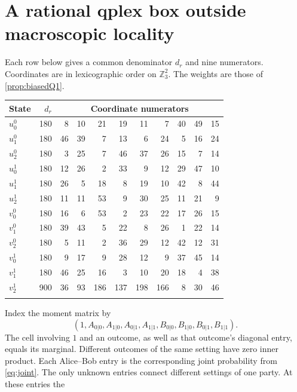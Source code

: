 \section{A rational qplex box outside macroscopic locality}\label{app:biased}
Each row below gives a common denominator $d_r$ and nine numerators. Coordinates
are in lexicographic order on $\mathbb Z_3^2$. The weights are those of \cref{prop:biasedQ1}.
\begin{center}
\small
\begin{tabular}{@{}lr@{\hspace{1.5em}}rrrrrrrrr@{}}
\toprule
State & $d_r$ & \multicolumn{9}{c}{Coordinate numerators}\\
\midrule
$u^{0}_{0}$ & 180 & 8 & 10 & 21 & 19 & 11 & 7 & 40 & 49 & 15 \\
$u^{0}_{1}$ & 180 & 46 & 39 & 7 & 13 & 6 & 24 & 5 & 16 & 24 \\
$u^{0}_{2}$ & 180 & 3 & 25 & 7 & 46 & 37 & 26 & 15 & 7 & 14 \\
\addlinespace[2.5pt]
$u^{1}_{0}$ & 180 & 12 & 26 & 2 & 33 & 9 & 12 & 29 & 47 & 10 \\
$u^{1}_{1}$ & 180 & 26 & 5 & 18 & 8 & 19 & 10 & 42 & 8 & 44 \\
$u^{1}_{2}$ & 180 & 11 & 11 & 53 & 9 & 30 & 25 & 11 & 21 & 9 \\
\addlinespace[2.5pt]
$v^{0}_{0}$ & 180 & 16 & 6 & 53 & 2 & 23 & 22 & 17 & 26 & 15 \\
$v^{0}_{1}$ & 180 & 39 & 43 & 5 & 22 & 8 & 26 & 1 & 22 & 14 \\
$v^{0}_{2}$ & 180 & 5 & 11 & 2 & 36 & 29 & 12 & 42 & 12 & 31 \\
\addlinespace[2.5pt]
$v^{1}_{0}$ & 180 & 9 & 17 & 9 & 28 & 12 & 9 & 37 & 45 & 14 \\
$v^{1}_{1}$ & 180 & 46 & 25 & 16 & 3 & 10 & 20 & 18 & 4 & 38 \\
$v^{1}_{2}$ & 900 & 36 & 93 & 186 & 137 & 198 & 166 & 8 & 30 & 46 \\
\addlinespace[2.5pt]
\bottomrule
\end{tabular}
\end{center}
Index the moment matrix by
\[
 (1,A_{0|0},A_{1|0},A_{0|1},A_{1|1},B_{0|0},B_{1|0},B_{0|1},B_{1|1}).
\]
The cell involving $1$ and an outcome, as well as that outcome's diagonal entry, equals
its marginal. Different outcomes of the same setting have zero inner product.
Each Alice--Bob entry is the corresponding joint probability from \eqref{eq:joint}.
The only unknown entries connect different settings of one party. At these entries the

